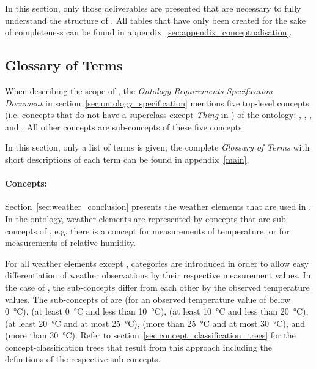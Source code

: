 In this section, only those deliverables are presented that are necessary to fully understand the structure of \smarthomeweather. All tables that have only been created for the sake of completeness can be found in appendix~\ref{sec:appendix_conceptualisation}.

\subsection{Glossary of Terms}
\label{sec:ontology_glossary}

When describing the scope of \smarthomeweather, the \emph{Ontology Requirements Specification Document} in section~\ref{sec:ontology_specification} mentions five top-level concepts (i.e. concepts that do not have a superclass except \emph{Thing} in ) of the ontology: , , , and . All other concepts are sub-concepts of these five concepts.

In this section, only a list of terms is given; the complete \emph{Glossary of Terms} with short descriptions of each term can be found in appendix~\ref{main}.

\paragraph{Concepts:}

Section~\ref{sec:weather_conclusion} presents the weather elements that are used in \smarthomeweather. In the ontology, weather elements are represented by concepts that are sub-concepts of , e.g. there is a concept  for measurements of temperature, or  for measurements of relative humidity.

For all weather elements except , categories are introduced in order to allow easy differentiation of weather observations by their respective measurement values. In the case of , the sub-concepts differ from each other by the observed temperature values. The sub-concepts of  are  (for an observed temperature value of below \SI{0}{\celsius}),  (at least \SI{0}{\celsius} and less than \SI{10}{\celsius}),  (at least \SI{10}{\celsius} and less than \SI{20}{\celsius}),  (at least \SI{20}{\celsius} and at most \SI{25}{\celsius}),  (more than \SI{25}{\celsius} and at most \SI{30}{\celsius}), and  (more than \SI{30}{\celsius}). Refer to section~\ref{sec:concept_classification_trees} for the concept-classification trees that result from this approach including the definitions of the respective sub-concepts.

